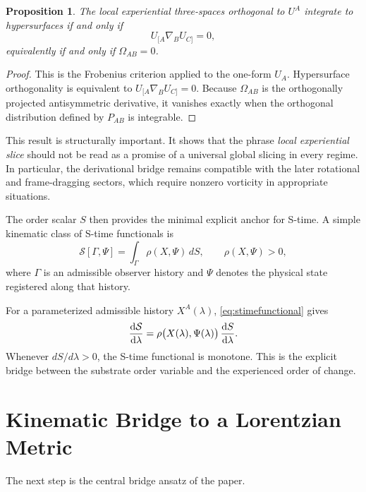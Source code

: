 \documentclass[11pt]{article}
\newcommand{\Order}{\mathcal{S}}
\newtheorem{proposition}{Proposition}
\begin{document}
\begin{proposition}
The local experiential three-spaces orthogonal to \(U^A\) integrate to hypersurfaces if and only if
\begin{equation}
U_{[A}\nabla_B U_{C]} = 0,
\label{eq:substratefrobenius}
\end{equation}
equivalently if and only if \(\Omega_{AB}=0\).
\end{proposition}

\begin{proof}
This is the Frobenius criterion applied to the one-form \(U_A\). Hypersurface orthogonality is equivalent to \(U_{[A}\nabla_B U_{C]}=0\). Because \(\Omega_{AB}\) is the orthogonally projected antisymmetric derivative, it vanishes exactly when the orthogonal distribution defined by \(P_{AB}\) is integrable.
\end{proof}

This result is structurally important. It shows that the phrase \emph{local experiential slice} should not be read as a promise of a universal global slicing in every regime. In particular, the derivational bridge remains compatible with the later rotational and frame-dragging sectors, which require nonzero vorticity in appropriate situations.

The order scalar \(S\) then provides the minimal explicit anchor for S-time. A simple kinematic class of S-time functionals is
\begin{equation}
\Order[\Gamma,\Psi]
=
\int_{\Gamma} \rho(X,\Psi)\, dS,
\qquad
\rho(X,\Psi) > 0,
\label{eq:stimefunctional}
\end{equation}
where \(\Gamma\) is an admissible observer history and \(\Psi\) denotes the physical state registered along that history.

For a parameterized admissible history \(X^A(\lambda)\), \eqref{eq:stimefunctional} gives
\begin{equation}
\dv{\Order}{\lambda}
=
\rho\bigl(X(\lambda),\Psi(\lambda)\bigr)\,
\dv{S}{\lambda}.
\label{eq:stimonotone}
\end{equation}
Whenever \(dS/d\lambda > 0\), the S-time functional is monotone. This is the explicit bridge between the substrate order variable and the experienced order of change.

\section{Kinematic Bridge to a Lorentzian Metric}

The next step is the central bridge ansatz of the paper.
\end{document}
